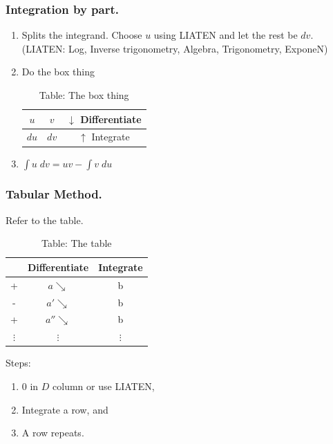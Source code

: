 \documentclass[../../../main.tex]{subfiles}
\begin{document}
\subsubsection{Integration by part.}
\begin{enumerate}
    \item Splits the integrand. Choose $u$ using LIATEN and let the rest be $dv$. (LIATEN: Log, Inverse trigonometry, Algebra, Trigonometry, ExponeN)
    \item Do the box thing
    \begin{table}[h]
        \begin{center}
    \caption*{Table: The box thing}
    \begin{tabular}{c || c || c}
        $u$&$v$&$\downarrow$ Differentiate\\ 
        \hline\hline
        $du$&$dv$&$\uparrow$ Integrate
    \end{tabular}
        \end{center}
    \end{table}
    \item $ \int u \;dv = uv - \int v\; du$
\end{enumerate}

\subsubsection{Tabular Method.} Refer to the table.
\begin{table}[h]
\begin{center}
\caption*{Table: The table}
\begin{tabular}{c || c || c}
    &Differentiate&Integrate \\ 
    \hline\hline
    +&$a\searrow$&b \\ 
    \hline
    -&$a'\searrow$&b \\ 
    \hline
    +&$a''\searrow$&b \\ 
    \hline
    $\vdots$&$\vdots$&$\vdots$
\end{tabular}
\end{center}
\end{table}
Steps:
\begin{enumerate}
    \item 0 in $D$ column or use LIATEN,
    \item Integrate a row, and
    \item A row repeats.
\end{enumerate}
\end{document}
